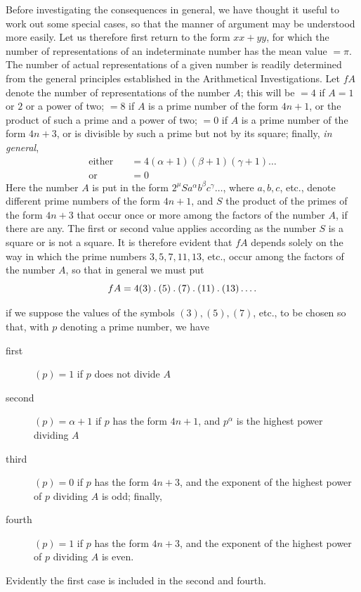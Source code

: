 \hypertarget{native-282-nexus6}{}\label{native-282-nexus6}
Before investigating the consequences in general, we have thought it useful to work out some special cases, so that the manner of argument may be understood more easily. Let us therefore first return to the form $xx+yy$, for which the number of representations of an indeterminate number has the mean value $=\pi$. The number of actual representations of a given number is readily determined from the general principles established in the Arithmetical Investigations. Let $fA$ denote the number of representations of the number $A$; this will be $=4$ if $A=1$ or $2$ or a power of two; $=8$ if $A$ is a prime number of the form $4n+1$, or the product
of such a prime and a power of two; $=0$ if $A$ is a prime number of the form $4n+3$, or is divisible by such a prime but not by its square; finally, \emph{in general},
\[
\begin{aligned}
\text{either}\quad&=4(\alpha+1)(\beta+1)(\gamma+1)\ldots\\
\text{or}\quad&=0
\end{aligned}
\]
Here the number $A$ is put in the form $2^\mu Sa^\alpha b^\beta c^\gamma\ldots$, where $a,b,c$, etc., denote different prime numbers of the form $4n+1$, and $S$ the product of the primes of the form $4n+3$ that occur once or more among the factors of the number $A$, if there are any. The first or second value applies according as the number $S$ is a square or is not a square. It is therefore evident that $fA$ depends solely on the way in which the prime numbers $3,5,7,11,13$, etc., occur among the factors of the number $A$, so that in general we must put
\[
fA=4(3)\mathbin{.}(5)\mathbin{.}(7)\mathbin{.}(11)\mathbin{.}(13)\mathinner{.\,.\,.\,.}
\]
\begin{samepage}
if we suppose the values of the symbols $(3),(5),(7)$, etc., to be chosen so that, with $p$ denoting a prime number, we have

\begin{description}
\item[first] $(p)=1$ if $p$ does not divide $A$
\item[second] $(p)=\alpha+1$ if $p$ has the form $4n+1$, and $p^\alpha$ is the highest power dividing $A$
\item[third] $(p)=0$ if $p$ has the form $4n+3$, and the exponent of the highest power of $p$ dividing $A$ is odd; finally,
\item[fourth] $(p)=1$ if $p$ has the form $4n+3$, and the exponent of the highest power of $p$ dividing $A$ is even.
\end{description}
\end{samepage}
Evidently the first case is included in the second and fourth.

